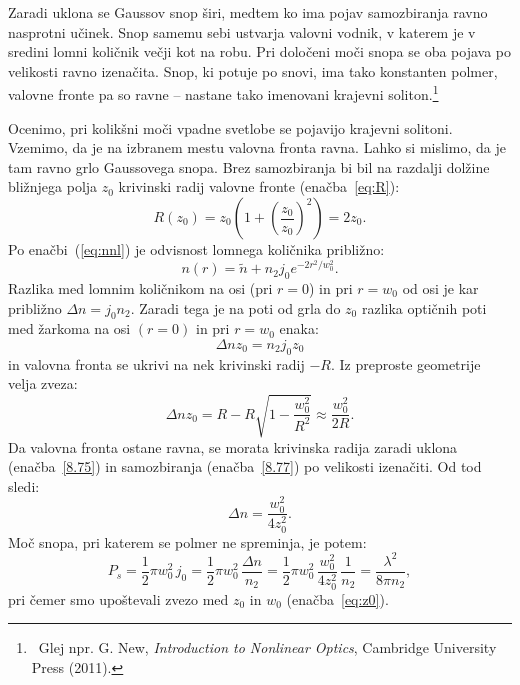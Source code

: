 Zaradi uklona se Gaussov snop širi, medtem ko ima pojav samozbiranja ravno nasprotni
učinek. Snop samemu sebi ustvarja valovni vodnik, v katerem je v sredini lomni količnik 
večji kot na robu. Pri določeni moči snopa se oba pojava po
velikosti ravno izenačita. Snop, ki potuje po snovi, ima tako konstanten polmer, 
valovne fronte pa so ravne -- nastane tako imenovani krajevni soliton.\footnote{~Glej npr. G. New, {\it Introduction
to Nonlinear Optics}, Cambridge University Press (2011).}

Ocenimo, pri kolikšni moči vpadne svetlobe se pojavijo krajevni solitoni. 
Vzemimo, da je na izbranem mestu valovna fronta ravna. Lahko si mislimo,
da je tam ravno grlo Gaussovega snopa. Brez samozbiranja bi bil na razdalji
dolžine bližnjega polja $z_{0}$ krivinski radij valovne fronte (enačba~\ref{eq:R}):
\begin{equation}
R(z_{0})=z_{0}\left( 1+\left(\frac{z_{0}}{z_{0}}\right)^{2}\right)=2z_{0}.
\label{8.75}
\end{equation}
Po enačbi~(\ref{eq:nnl}) je odvisnost lomnega količnika približno:
\begin{equation}
n(r)=\tilde{n}+n_2 j_0 e^{-2r^2/w_0^2}.
\label{8.76}
\end{equation}
Razlika med lomnim količnikom na osi (pri $r=0$) in pri $r = w_{0}$ 
od osi je kar približno $\Delta n= j_{0} n_{2}$.
Zaradi tega je na poti od grla do $z_0$ razlika optičnih poti med žarkoma na osi $(r=0)$ in 
pri $r= w_{0}$ enaka:
\begin{equation}
\Delta nz_{0} = n_2 j_0 z_0
\end{equation}
in valovna fronta se 
ukrivi na nek krivinski radij $-R$. Iz preproste geometrije velja zveza:
\begin{equation}
\Delta nz_{0}=R-R\sqrt{1-\frac{w_{0}^{2}}{R^{2}}}\approx \frac{w_{0}^{2}}{2R}.
\label{8.77}
\end{equation}
Da valovna fronta ostane ravna, se morata krivinska radija zaradi uklona 
(enačba~\ref{8.75}) in samozbiranja (enačba~\ref{8.77}) po velikosti izenačiti. 
Od tod sledi:
\begin{equation}
\Delta n=\frac{w_{0}^{2}}{4z_{0}^{2}}.
\label{8.78}
\end{equation}
Moč snopa, pri katerem se polmer ne spreminja, je potem: 
\begin{equation}
P_{s}= \frac{1}{2}\pi w_0^2 \,j_0 = \frac{1}{2}\pi w_0^2 \, \frac{\Delta n}{n_2} = 
\frac{1}{2}\pi w_0^2 \,\frac{w_{0}^{2}}{4z_{0}^{2}}\,\frac{1}{n_2} = \frac{\lambda^2}{8\pi n_2},
\label{8.79}
\end{equation}
pri čemer smo upoštevali zvezo med $z_0$ in $w_0$ (enačba~\ref{eq:z0}).

